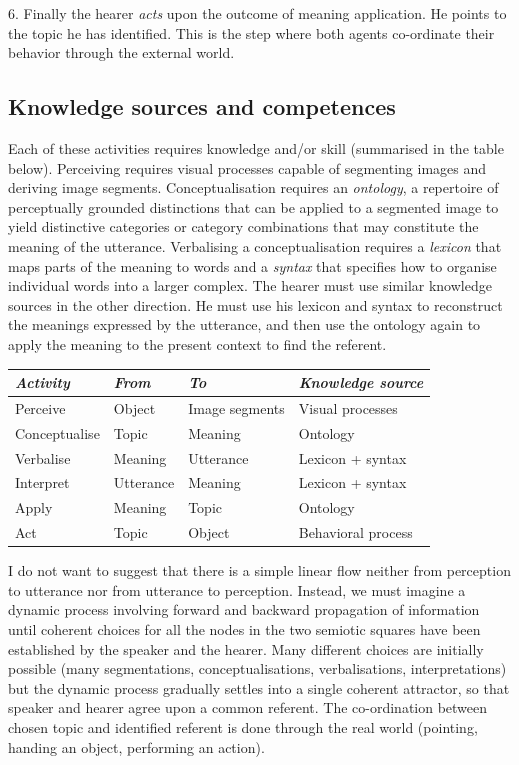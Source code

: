 6. Finally the hearer {\it acts} upon the outcome of meaning
application. He points to the topic he has identified. This is the 
step where both agents co-ordinate their 
behavior through the external world. 

\subsection{Knowledge sources and competences}

Each of these activities requires knowledge and/or skill
(summarised in the table below). Perceiving requires 
visual processes capable of segmenting images and deriving image 
segments. Conceptualisation requires an {\it ontology}, 
a repertoire of perceptually grounded distinctions
that can be applied to a segmented image to yield 
distinctive categories or category combinations that 
may constitute the meaning of the utterance. Verbalising 
a conceptualisation requires 
a {\it lexicon} that maps parts of the meaning to words and 
a {\it syntax} that specifies how to organise individual words
into a larger complex. 
The hearer must use similar 
knowledge sources in the other direction. He must use 
his lexicon and syntax to reconstruct the meanings expressed
by the utterance, and then use the 
ontology again to apply the meaning to the present 
context to find the referent. 
\begin{center}
\begin{tabular}{| l | l | l | l |} \hline
{\it Activity} & {\it From} & {\it To} & {\it Knowledge source}\\ \hline
Perceive & Object & Image segments & Visual processes \\ \hline
Conceptualise & Topic & Meaning & Ontology  \\ \hline
Verbalise & Meaning & Utterance & Lexicon + syntax \\ \hline \hline
Interpret & Utterance & Meaning & Lexicon + syntax \\ \hline
Apply & Meaning & Topic & Ontology \\ \hline
Act & Topic & Object & Behavioral process  \\ \hline
\end{tabular}
\end{center}

I do not want to suggest that there is a simple linear flow 
neither from perception to utterance nor from utterance to 
perception. Instead, we must imagine a dynamic process 
involving forward and backward propagation of information 
until coherent choices for all the nodes in the two
semiotic squares have been established by the speaker and 
the hearer. Many different choices are initially possible 
(many segmentations, conceptualisations, verbalisations, 
interpretations) but the dynamic process gradually settles into 
a single coherent attractor, so that speaker and hearer 
agree upon a common referent. The co-ordination between 
chosen topic and identified referent is done through 
the real world (pointing, handing an object, performing
an action). 

